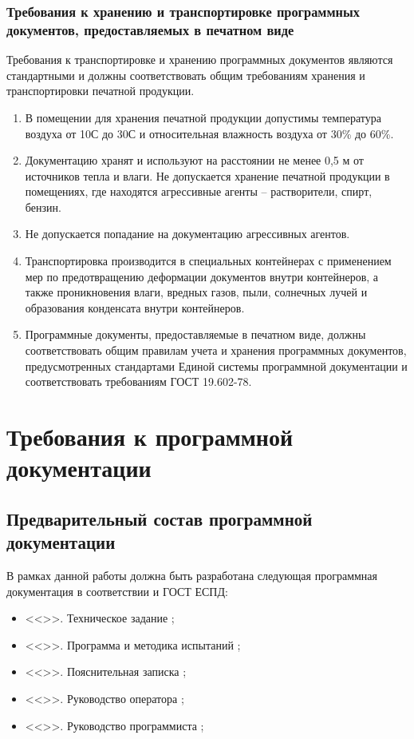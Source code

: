 \documentclass[a4paper,12pt,reqno]{article}
\begin{document}
  \subsubsection{Требования к хранению и транспортировке программных документов, предоставляемых в печатном виде}
  Требования к транспортировке и хранению программных документов являются стандартными и должны соответствовать общим требованиям хранения и транспортировки печатной продукции.
  \begin{enumerate}
    \item В помещении для хранения печатной продукции допустимы температура воздуха от 10\degree С до 30\degree С и относительная влажность воздуха от 30\% до 60\%.
    \item Документацию хранят и используют на расстоянии не менее 0,5 м от источников тепла и влаги. Не допускается хранение печатной продукции в помещениях, где находятся агрессивные агенты -- растворители, спирт, бензин.
    \item Не допускается попадание на документацию агрессивных агентов.
    \item Транспортировка производится в специальных контейнерах с применением мер по предотвращению деформации документов внутри контейнеров, а также проникновения влаги, вредных газов, пыли, солнечных лучей и образования конденсата внутри контейнеров.
    \item Программные документы, предоставляемые в печатном виде, должны соответствовать общим правилам учета и хранения программных документов, предусмотренных стандартами Единой системы программной документации и соответствовать требованиям ГОСТ 19.602-78.
  \end{enumerate}

  \newpage
  \section{Требования к программной документации}
  \subsection{Предварительный состав программной документации}
  \label{sec:doclist}
  В рамках данной работы должна быть разработана следующая программная документация в соответствии и ГОСТ ЕСПД:
  \begin{itemize}
    \item <<\CRTname>>. Техническое задание \cite{gostTZ};
    \item <<\CRTname>>. Программа и методика испытаний \cite{gostPMI};
    \item <<\CRTname>>. Пояснительная записка \cite{gostPZ};
    \item <<\CRTname>>. Руководство оператора \cite{gostRO};
    \item <<\CRTname>>. Руководство программиста \cite{gostRP};
  \end{itemize}
\end{document}
